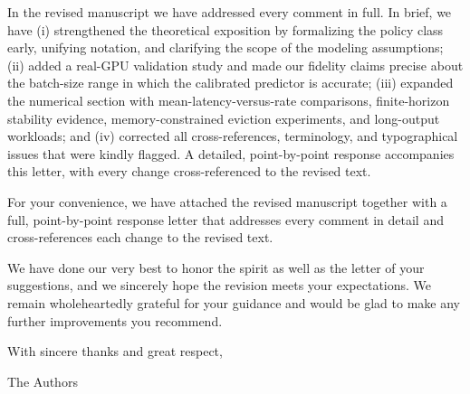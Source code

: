 \documentclass[11pt]{article}
\begin{document}
In the revised manuscript we have addressed every comment in full. In brief, we have (i) strengthened the theoretical exposition by formalizing the policy class early, unifying notation, and clarifying the scope of the modeling assumptions; (ii) added a real-GPU validation study and made our fidelity claims precise about the batch-size range in which the calibrated predictor is accurate; (iii) expanded the numerical section with mean-latency-versus-rate comparisons, finite-horizon stability evidence, memory-constrained eviction experiments, and long-output workloads; and (iv) corrected all cross-references, terminology, and typographical issues that were kindly flagged. A detailed, point-by-point response accompanies this letter, with every change cross-referenced to the revised text.

For your convenience, we have attached the revised manuscript together with a full, point-by-point response letter that addresses every comment in detail and cross-references each change to the revised text.

We have done our very best to honor the spirit as well as the letter of your suggestions, and we sincerely hope the revision meets your expectations. We remain wholeheartedly grateful for your guidance and would be glad to make any further improvements you recommend.

\vspace{1em}

With sincere thanks and great respect,

\vspace{0.5em}

\noindent The Authors
\end{document}
